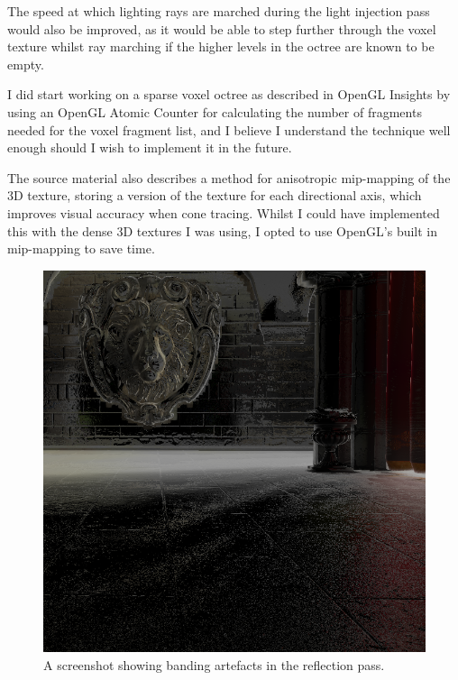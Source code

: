 \documentclass[]{acmsiggraph}
\begin{document}
The speed at which lighting rays are marched during the light injection pass would also be improved, as it would be able to step further through the voxel texture whilst ray marching if the higher levels in the octree are known to be empty.

I did start working on a sparse voxel octree as described in OpenGL Insights \cite{crassingreen2012} by using an OpenGL Atomic Counter for calculating the number of fragments needed for the voxel fragment list, and I believe I understand the technique well enough should I wish to implement it in the future.

The source material \cite{crassinneyretsainzgreeneisemann2011} also describes a method for anisotropic mip-mapping of the 3D texture, storing a version of the texture for each directional axis, which improves visual accuracy when cone tracing. Whilst I could have implemented this with the dense 3D textures I was using, I opted to use OpenGL's built in mip-mapping to save time.

\begin{figure}[htbp]\centering
 \includegraphics[width=1.0\linewidth]{images/banding.png}
 \caption{A screenshot showing banding artefacts in the reflection pass.}
\end{figure}
\end{document}
